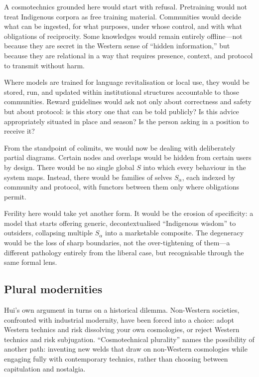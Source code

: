 \documentclass[12pt,a4paper]{article}
\begin{document}
A cosmotechnics grounded here would start with refusal. Pretraining would not treat Indigenous corpora as free training material. Communities would decide what can be ingested, for what purposes, under whose control, and with what obligations of reciprocity. Some knowledges would remain entirely offline---not because they are secret in the Western sense of ``hidden information,'' but because they are relational in a way that requires presence, context, and protocol to transmit without harm.

Where models are trained for language revitalisation or local use, they would be stored, run, and updated within institutional structures accountable to those communities. Reward guidelines would ask not only about correctness and safety but about protocol: is this story one that can be told publicly? Is this advice appropriately situated in place and season? Is the person asking in a position to receive it?

From the standpoint of colimits, we would now be dealing with deliberately partial diagrams. Certain nodes and overlaps would be hidden from certain users by design. There would be no single global $S$ into which every behaviour in the system maps. Instead, there would be families of selves $S_\alpha$, each indexed by community and protocol, with functors between them only where obligations permit.

Ferility here would take yet another form. It would be the erosion of specificity: a model that starts offering generic, decontextualised ``Indigenous wisdom'' to outsiders, collapsing multiple $S_\alpha$ into a marketable composite. The degeneracy would be the loss of sharp boundaries, not the over-tightening of them---a different pathology entirely from the liberal case, but recognisable through the same formal lens.

\subsection*{Plural modernities}

Hui's own argument in \cite{Hui2016} turns on a historical dilemma. Non-Western societies, confronted with industrial modernity, have been forced into a choice: adopt Western technics and risk dissolving your own cosmologies, or reject Western technics and risk subjugation. ``Cosmotechnical plurality'' names the possibility of another path: inventing new welds that draw on non-Western cosmologies while engaging fully with contemporary technics, rather than choosing between capitulation and nostalgia.
\end{document}
